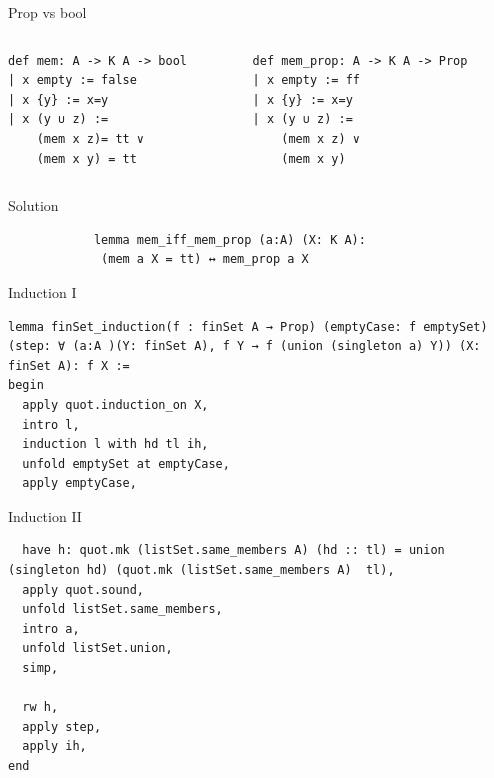 \documentclass[aspectratio=169]{beamer}
\begin{document}
\begin{frame}[fragile]{Prop vs bool}
    \begin{columns}
        \begin{column}{.5\textwidth}
            \begin{lstlisting}
def mem: A -> K A -> bool
| x empty := false
| x {y} := x=y
| x (y ∪ z) := 
    (mem x z)= tt ∨
    (mem x y) = tt
            \end{lstlisting}
        \end{column}
        \begin{column}{.5\textwidth}
            \begin{lstlisting}
def mem_prop: A -> K A -> Prop
| x empty := ff
| x {y} := x=y
| x (y ∪ z) := 
    (mem x z) ∨
    (mem x y)
            \end{lstlisting}
        \end{column}
    \end{columns}

    \begin{block}{Solution}
        \begin{lstlisting}
            lemma mem_iff_mem_prop (a:A) (X: K A):
             (mem a X = tt) ↔ mem_prop a X
        \end{lstlisting}
    \end{block}
\end{frame}

\begin{frame}[fragile]{Induction I}
    \begin{lstlisting}
lemma finSet_induction(f : finSet A → Prop) (emptyCase: f emptySet) (step: ∀ (a:A )(Y: finSet A), f Y → f (union (singleton a) Y)) (X: finSet A): f X :=
begin
  apply quot.induction_on X,
  intro l,
  induction l with hd tl ih,
  unfold emptySet at emptyCase,
  apply emptyCase,
    \end{lstlisting}
\end{frame}

\begin{frame}[fragile]{Induction II}
    \begin{lstlisting}
  have h: quot.mk (listSet.same_members A) (hd :: tl) = union (singleton hd) (quot.mk (listSet.same_members A)  tl),
  apply quot.sound,
  unfold listSet.same_members,
  intro a,
  unfold listSet.union,
  simp,

  rw h,
  apply step,
  apply ih,
end
    \end{lstlisting}
\end{frame}
\end{document}

